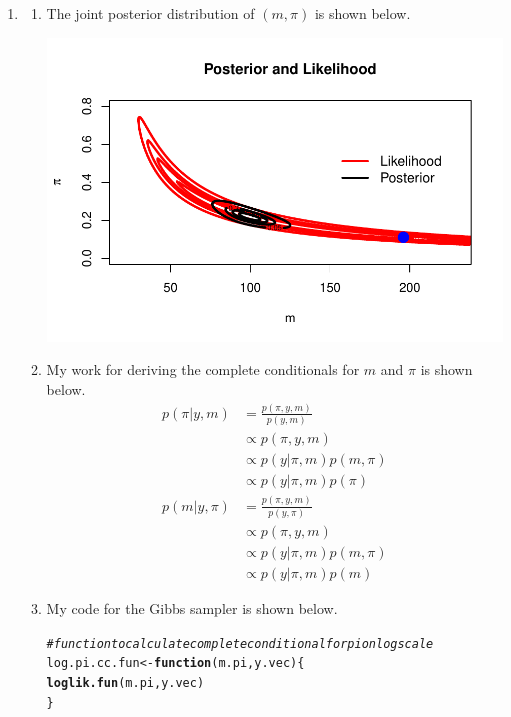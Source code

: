\documentclass[12pt]{article}\usepackage[]{graphicx}\usepackage[]{color}
\makeatletter
\newcommand{\hlcom}[1]{\textcolor[rgb]{0.678,0.584,0.686}{\textit{#1}}}%
\newcommand{\hlstd}[1]{\textcolor[rgb]{0.345,0.345,0.345}{#1}}%
\newcommand{\hlkwa}[1]{\textcolor[rgb]{0.161,0.373,0.58}{\textbf{#1}}}%
\newcommand{\hlkwb}[1]{\textcolor[rgb]{0.69,0.353,0.396}{#1}}%
\newcommand{\hlkwc}[1]{\textcolor[rgb]{0.333,0.667,0.333}{#1}}%
\newcommand{\hlkwd}[1]{\textcolor[rgb]{0.737,0.353,0.396}{\textbf{#1}}}%
\newenvironment{kframe}{%
 \def\at@end@of@kframe{}%
 \ifinner\ifhmode%
  \def\at@end@of@kframe{\end{minipage}}%
  \begin{minipage}{\columnwidth}%
 \fi\fi%
 \def\FrameCommand##1{\hskip\@totalleftmargin \hskip-\fboxsep
 \colorbox{shadecolor}{##1}\hskip-\fboxsep
     \hskip-\linewidth \hskip-\@totalleftmargin \hskip\columnwidth}%
 \MakeFramed {\advance\hsize-\width
   \@totalleftmargin\z@ \linewidth\hsize
   \@setminipage}}%
 {\par\unskip\endMakeFramed%
 \at@end@of@kframe}
\newenvironment{knitrout}{}{} %
\makeatother
\begin{document}
\begin{enumerate}
\begin{enumerate}
\begin{knitrout}
\end{knitrout}

\item \begin{enumerate}

\item The joint posterior distribution of $(m, \pi)$ is shown below.

\begin{knitrout}\footnotesize
{}\color{fgcolor}
\includegraphics[width=\linewidth]{figure/jointpost-1} 

\end{knitrout}

\item My work for deriving the complete conditionals for $m$ and $\pi$ is shown below.
\begin{align*}
p(\pi|y, m) &= \frac{p(\pi, y, m)}{p(y, m)} \\
&\propto p(\pi, y, m) \\
&\propto p(y|\pi, m)p(m, \pi) \\
&\propto p(y|\pi, m)p(\pi) \\
p(m|y, \pi) &= \frac{p(\pi, y, m)}{p(y, \pi)} \\
&\propto p(\pi, y, m) \\
&\propto p(y|\pi, m)p(m, \pi) \\
&\propto p(y|\pi, m)p(m)
\end{align*}

\item My code for the Gibbs sampler is shown below.

\begin{knitrout}\footnotesize
{}\color{fgcolor}\begin{kframe}
\begin{alltt}
\hlcom{#function to calculate complete conditional for pi on log scale}
\hlstd{log.pi.cc.fun} \hlkwb{<-} \hlkwa{function}\hlstd{(}\hlkwc{m.pi}\hlstd{,} \hlkwc{y.vec}\hlstd{)\{}
  \hlkwd{loglik.fun}\hlstd{(m.pi, y.vec)}
\hlstd{\}}


\end{alltt}
\end{kframe}
\end{knitrout}
\end{enumerate}
\end{enumerate}
\end{enumerate}
\end{document}

